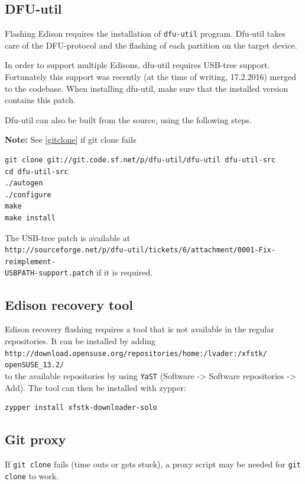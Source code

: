 \documentclass[a4paper,11pt]{article}
\newcommand{\note}{\textbf{Note: }}
\newcommand{\cmd}[1]{\texttt{#1}}
\begin{document}
\subsection*{DFU-util}
\label{dfuutil}

Flashing Edison requires the installation of \cmd{dfu-util} program. Dfu-util takes care of the DFU-protocol and the flashing of each partition on the target device.

In order to support multiple Edisons, dfu-util requires USB-tree support. Fortunately this support was recently (at the time of writing, 17.2.2016) merged to the codebase. When installing dfu-util, make sure that the installed version contains this patch. 

Dfu-util can also be built from the source, using the following steps.

\note See \ref{gitclone} if git clone fails

\begin{lstlisting}
git clone git://git.code.sf.net/p/dfu-util/dfu-util dfu-util-src
cd dfu-util-src
./autogen
./configure
make
make install
\end{lstlisting}

The USB-tree patch is available at \\ \cmd{http://sourceforge.net/p/dfu-util/tickets/6/attachment/0001-Fix-reimplement-\\USBPATH-support.patch} if it is required.

\subsection*{Edison recovery tool}

Edison recovery flashing requires a tool that is not available in the regular repositories. It can be installed by adding \\
\cmd{http://download.opensuse.org/repositories/home:/lvader:/xfstk/
openSUSE\_13.2/} \\
to the available repositories by using \cmd{YaST} (Software -> Software repositories -> Add). The tool can then be installed with zypper:
\begin{lstlisting}
zypper install xfstk-downloader-solo
\end{lstlisting}

\subsection*{Git proxy}
\label{gitclone}
If \cmd{git clone} fails (time outs or gets stuck), a proxy script may be needed for \cmd{git clone} to work.
\end{document}
